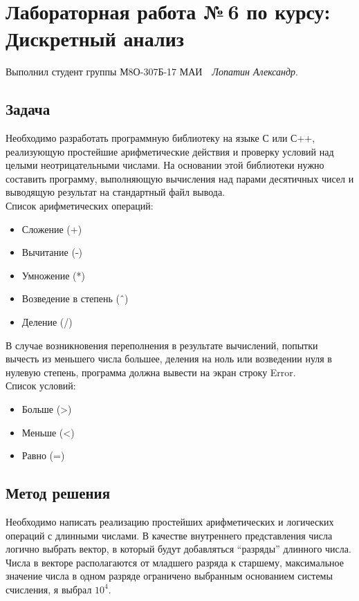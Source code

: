 \documentclass[12pt]{article}
\begin{document}
\section*{\centering Лабораторная работа №\,6 по курсу:\\ Дискретный анализ}

Выполнил студент группы М8О-307Б-17 МАИ \,\, \textit{Лопатин Александр}.

\subsection*{Задача}

\noindent Необходимо разработать программную библиотеку на языке С или
С++, реализующую простейшие арифметические действия и проверку условий над
целыми неотрицательными числами. На основании этой библиотеки нужно составить
программу, выполняющую вычисления над парами десятичных чисел и выводящую
результат на стандартный файл вывода.\\


Список арифметических операций:
\begin{itemize}
	\item Сложение (+)
	\item Вычитание (-)
	\item Умножение (*)
	\item Возведение в степень (ˆ)
	\item Деление (/)
\end{itemize}



В случае возникновения переполнения в результате вычислений, попытки вычесть из мень\-шего числа большее, деления на ноль или возведении нуля в нулевую степень, про\-грамма должна вывести на экран строку Error.\\

Список условий:
\begin{itemize}
\item Больше (>)
\item Меньше (<)
\item Равно (=)
\end{itemize}

\newpage

\subsection*{Метод решения}

Необходимо написать реализацию простейших арифметических и логических  операций с длинными числами. В качестве внутреннего представления числа логично выбрать вектор, в который будут добавляться ``разряды'' длинного числа. Числа в векторе располагаются от младшего разряда к старшему, максимальное значение числа в одном разряде ограничено выбранным основанием системы счисления, я выбрал $10^4$.
\end{document}
